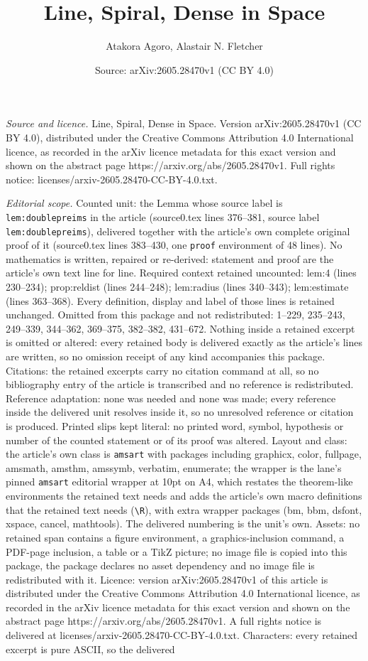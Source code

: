 \documentclass[10pt,a4paper]{amsart}
\title[Line, Spiral, Dense in Space]{Line, Spiral, Dense in Space}
\author{Atakora Agoro, Alastair N. Fletcher}
\date{Source: arXiv:2605.28470v1 (CC BY 4.0)}
\begin{document}
\maketitle

\noindent\emph{Source and licence.} Line, Spiral, Dense in Space. Version arXiv:2605.28470v1 (CC BY 4.0), distributed under the Creative Commons Attribution 4.0 International licence, as recorded in the arXiv licence metadata for this exact version and shown on the abstract page https://arxiv.org/abs/2605.28470v1. Full rights notice: licenses/arxiv-2605.28470-CC-BY-4.0.txt.\par\smallskip

\noindent\textit{Editorial scope.} Counted unit: the Lemma whose source label is \texttt{lem:doublepreims} in the article (source0.tex lines 376--381, source label \texttt{lem:doublepreims}), delivered together with the article's own complete original proof of it (source0.tex lines 383--430, one \texttt{proof} environment of 48 lines). No mathematics is written, repaired or re-derived: statement and proof are the article's own text line for line. Required context retained uncounted: lem:4 (lines 230--234); prop:reldist (lines 244--248); lem:radius (lines 340--343); lem:estimate (lines 363--368). Every definition, display and label of those lines is retained unchanged. Omitted from this package and not redistributed: 1--229, 235--243, 249--339, 344--362, 369--375, 382--382, 431--672. Nothing inside a retained excerpt is omitted or altered: every retained body is delivered exactly as the article's lines are written, so no omission receipt of any kind accompanies this package. Citations: the retained excerpts carry no citation command at all, so no bibliography entry of the article is transcribed and no reference is redistributed. Reference adaptation: none was needed and none was made; every reference inside the delivered unit resolves inside it, so no unresolved reference or citation is produced. Printed slips kept literal: no printed word, symbol, hypothesis or number of the counted statement or of its proof was altered. Layout and class: the article's own class is \texttt{amsart} with packages including graphicx, color, fullpage, amsmath, amsthm, amssymb, verbatim, enumerate; the wrapper is the lane's pinned \texttt{amsart} editorial wrapper at 10pt on A4, which restates the theorem-like environments the retained text needs and adds the article's own macro definitions that the retained text needs (\texttt{\textbackslash R}), with extra wrapper packages (bm, bbm, dsfont, xspace, cancel, mathtools). The delivered numbering is the unit's own. Assets: no retained span contains a figure environment, a graphics-inclusion command, a PDF-page inclusion, a table or a TikZ picture; no image file is copied into this package, the package declares no asset dependency and no image file is redistributed with it. Licence: version arXiv:2605.28470v1 of this article is distributed under the Creative Commons Attribution 4.0 International licence, as recorded in the arXiv licence metadata for this exact version and shown on the abstract page https://arxiv.org/abs/2605.28470v1. A full rights notice is delivered at licenses/arxiv-2605.28470-CC-BY-4.0.txt. Characters: every retained excerpt is pure ASCII, so the delivered 
\end{document}
